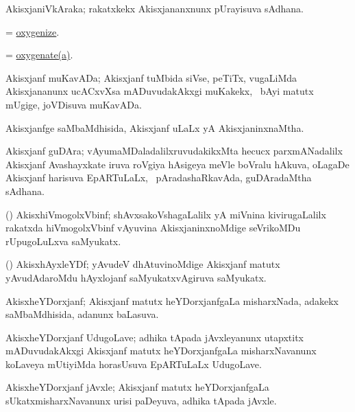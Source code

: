 \bentry
{}
\gl{\nA}
\bmng
AkisxjaniVkAraka; rakatxkekx Akisxjananxnunx pUrayisuva sAdhana. 
\emng
\eentry

\bentry
{}
\gl{\sakirx}
\bmng
= \hyperlink{oxygenize}{oxygenize}. 
\emng
\eentry

\bentry
{}
\gl{\sakirx}
\bmng
= \hyperlink{oxygenate(a)}{oxygenate(a)}. 
\emng
\eentry

\bentry
{}
\gl{\nA}
\bmng
Akisxjanf muKavADa; Akisxjanf tuMbida siVse, peTiTx, \mo vugaLiMda Akisxjananunx ucACxvXsa mADuvudakAkxgi muKakekx, \kanmu\ bAyi matutx mUgige, joVDisuva muKavADa. 
\emng
\eentry

\bentry
{}
\gl{\gu}
\bmng
Akisxjanfge saMbaMdhisida, Akisxjanf uLaLx yA AkisxjaninxnaMtha. 
\emng
\eentry

\bentry
{}
\gl{\nA}
\bmng
Akisxjanf guDAra; vAyumaMDaladalilxruvudakikxMta hecucx parxmANadalilx Akisxjanf Avashayxkate iruva roVgiya hAsigeya meVle boVralu hAkuva, oLagaDe Akisxjanf harisuva EpARTuLaLx, \sA\ pAradashaRkavAda, guDAradaMtha sAdhana. 
\emng
\eentry

\bentry
{}
\gl{\nA}
\bmng
(\jiVra) AkisxhiVmogolxVbinf; shAvxsakoVshagaLalilx yA miVnina kivirugaLalilx rakatxda hiVmogolxVbinf vAyuvina AkisxjaninxnoMdige seVrikoMDu rUpugoLuLxva saMyukatx. 
\emng
\eentry

\bentry
{}
\gl{\nA}
\bmng
(\ravi) AkisxhAyxleYDf; yAvudeV dhAtuvinoMdige Akisxjanf matutx yAvudAdaroMdu hAyxlojanf saMyukatxvAgiruva saMyukatx. 
\emng
\eentry

\bentry
{}
\gl{\gu}
\bmng
AkisxheYDorxjanf; Akisxjanf matutx heYDorxjanfgaLa misharxNada, adakekx saMbaMdhisida, adanunx baLasuva. 
\emng
\eentry

\bentry
{}
\gl{\nA}
\bmng
AkisxheYDorxjanf UdugoLave; adhika tApada jAvxleyanunx utapxtitx mADuvudakAkxgi Akisxjanf matutx heYDorxjanfgaLa misharxNavanunx koLaveya mUtiyiMda horasUsuva EpARTuLaLx UdugoLave. 
\emng
\eentry

\bentry
{}
\gl{\nA}
\bmng
AkisxheYDorxjanf jAvxle; Akisxjanf matutx heYDorxjanfgaLa sUkatxmisharxNavanunx urisi paDeyuva, adhika tApada jAvxle. 
\emng
\eentry

